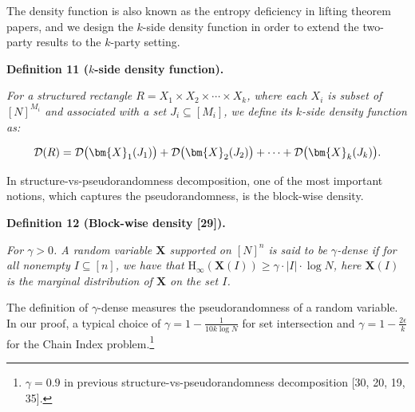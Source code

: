 \documentclass[10pt,a4paper]{article}
\begin{document}
The density function is also known as the entropy deficiency in lifting theorem papers, and we design the $k$-side density function in order to extend the two-party results to the $k$-party setting.\par





\par\medskip\noindent\textbf{
\textbf{Definition 11}\textbf{ }($k$-side density function)\textbf{.}
}\par



\emph{For a structured rectangle $R=X_{1}\times X_{2}\times\cdots\times X_{k}$, where each $X_{i}$ is subset of $[N]^{M_{i}}$ and associated with a set $J_{i}\subseteq[M_{i}]$, we define its $k$-side density function as:}\par


\[\begin{gathered}
\mathcal{D}(R)=\mathcal{D}\big{(}\bm{X}_{1}(J_{1})\big{)}+\mathcal{D}\big{(}\bm{X}_{2}(J_{2})\big{)}+\cdots+\mathcal{D}\big{(}\bm{X}_{k}(J_{k})\big{)}.
\end{gathered}\]






In structure-vs-pseudorandomness decomposition, one of the most important notions, which captures the pseudorandomness, is the block-wise density.\par





\par\medskip\noindent\textbf{
\textbf{Definition 12}\textbf{ }(Block-wise density [29])\textbf{.}
}\par



\emph{For $\gamma>0$. A random variable $\bm{X}$ supported on $[N]^{n}$ is said to be $\gamma$-dense if for all nonempty $I\subseteq[n]$, we have that $\text{H}_{\infty}(\bm{X}(I))\geq\gamma\cdot|I|\cdot\log N$, here $\bm{X}(I)$ is the marginal distribution of $\bm{X}$ on the set $I$.}\par






The definition of $\gamma$-dense measures the pseudorandomness of a random variable. In our proof, a typical choice of $\gamma=1-\frac{1}{10k\log N}$ for set intersection and $\gamma=1-\frac{2\epsilon}{k}$ for the Chain Index problem.\footnote{$\gamma=0.9$ in previous structure-vs-pseudorandomness decomposition [30, 20, 19, 35]. }\par
\end{document}
